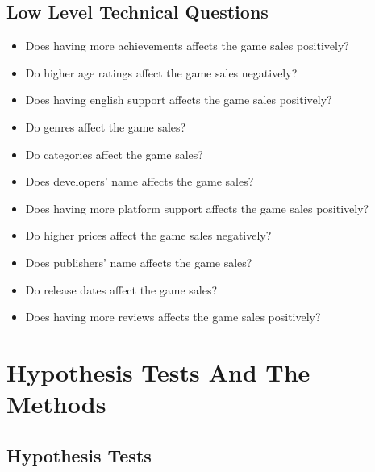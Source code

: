 \documentclass[conference]{IEEEtran}
\begin{document}
\subsection{Low Level Technical Questions}
\begin{itemize}
\item Does having more achievements affects the game sales positively?
\item Do higher age ratings affect the game sales negatively?
\item Does having english support affects the game sales positively?
\item Do genres affect the game sales?
\item Do categories affect the game sales?
\item Does developers' name affects the game sales?
\item Does having more platform support affects the game sales positively?
\item Do higher prices affect the game sales negatively?
\item Does publishers' name affects the game sales?
\item Do release dates affect the game sales?
\item Does having more reviews affects the game sales positively?
\end{itemize}


\section{Hypothesis Tests And The
Methods}

\subsection{Hypothesis Tests}
\end{document}
